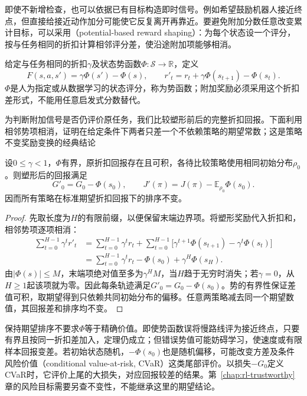 即使不新增检查，也可以依据已有目标构造即时信号。例如希望鼓励机器人接近终点，但直接给接近动作加分可能使它反复离开再靠近。要避免附加分数任意改变累计目标，可以采用（potential-based reward shaping）：为每个状态设一个评分，按与任务相同的折扣计算相邻评分差，使沿途附加项能够相消。

\begin{definition}[潜势型塑形]
  \label{def:rl-reward-shaping}
  给定与任务相同的折扣$\gamma$及状态势函数$\Phi:\mathcal S\to\mathbb R$，定义
  \[
    F(s,a,s')=\gamma\Phi(s')-\Phi(s),\qquad
    r'_t=r_t+\gamma\Phi(s_{t+1})-\Phi(s_t).
  \]
  $\Phi$是人为指定或从数据学习的状态评分，称为势函数；附加奖励必须采用这个折扣差形式，不能用任意启发式分数替代。
\end{definition}

为判断附加信号是否仍评价原任务，我们比较塑形前后的完整折扣回报。下面利用相邻势项相消，证明在给定条件下两者只差一个不依赖策略的期望常数；这是策略不变奖励变换的经典结论

\begin{theorem}[无限折扣时域的塑形不变性]
  \label{thm:rl-reward-shaping}
  设$0\leq\gamma<1$，$\Phi$有界，原折扣回报存在且可积，各待比较策略使用相同初始分布$\rho_0$。则塑形后的回报满足
  \[
    G'_0=G_0-\Phi(s_0),\qquad
    J'(\pi)=J(\pi)-\mathbb E_{\rho_0}\Phi(s_0).
  \]
  因而所有策略在标准期望折扣回报下的排序不变。
\end{theorem}

\begin{proof}
  先取长度为$H$的有限前缀，以便保留末端边界项。将塑形奖励代入折扣和，相邻势项逐项相消：
  \begin{align*}
    \sum_{t=0}^{H-1}\gamma^t r'_t
    &=\sum_{t=0}^{H-1}\gamma^t r_t
       +\sum_{t=0}^{H-1}
          \bigl[\gamma^{t+1}\Phi(s_{t+1})
                          -\gamma^t\Phi(s_t)\bigr]\\
    &=\sum_{t=0}^{H-1}\gamma^t r_t
       -\Phi(s_0)+\gamma^H\Phi(s_H).
  \end{align*}
  由$|\Phi(s)|\leq M$，末端项绝对值至多为$\gamma^H M$，当$H$趋于无穷时消失；若$\gamma=0$，从$H\geq1$起该项就为零。因此每条轨迹满足$G'_0=G_0-\Phi(s_0)$。势的有界性保证差值可积，取期望得到只依赖共同初始分布的偏移。任意两策略减去同一个期望数值，其回报差和排序均不变。
\end{proof}

保持期望排序不要求$\Phi$等于精确价值。即使势函数误将慢路线评为接近终点，只要有界且按同一折扣差加入，定理仍成立；但错误势值可能妨碍学习，使速度或有限样本回报变差。若初始状态随机，$-\Phi(s_0)$也是随机偏移，可能改变方差及条件风险价值（conditional value-at-risk, CVaR）这类尾部评价。以损失$-G_0$定义CVaR时，它评价上尾的大损失，对应回报较差的结果。第~\ref{chap:rl-trustworthy}章的风险目标需要另查不变性，不能继承这里的期望结论。

